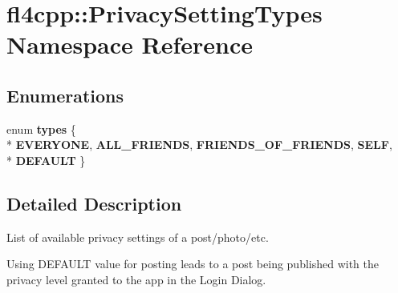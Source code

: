 \hypertarget{namespacefl4cpp_1_1_privacy_setting_types}{}\section{fl4cpp\+:\+:Privacy\+Setting\+Types Namespace Reference}
\label{namespacefl4cpp_1_1_privacy_setting_types}
\subsection*{Enumerations}
\begin{DoxyCompactItemize}
\item 
enum {\bfseries types} \{ \\*
{\bfseries E\+V\+E\+R\+Y\+O\+NE}, 
{\bfseries A\+L\+L\+\_\+\+F\+R\+I\+E\+N\+DS}, 
{\bfseries F\+R\+I\+E\+N\+D\+S\+\_\+\+O\+F\+\_\+\+F\+R\+I\+E\+N\+DS}, 
{\bfseries S\+E\+LF}, 
\\*
{\bfseries D\+E\+F\+A\+U\+LT}
 \}\hypertarget{namespacefl4cpp_1_1_privacy_setting_types_abef5c06854519bb4b38afd3c680acba0}{}\label{namespacefl4cpp_1_1_privacy_setting_types_abef5c06854519bb4b38afd3c680acba0}

\end{DoxyCompactItemize}


\subsection{Detailed Description}
List of available privacy settings of a post/photo/etc.

Using D\+E\+F\+A\+U\+LT value for posting leads to a post being published with the privacy level granted to the app in the Login Dialog. 